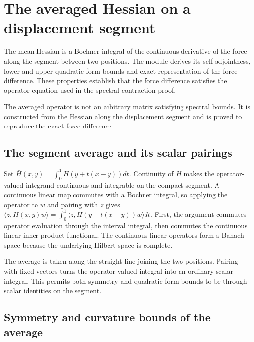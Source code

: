 \documentclass[11pt,a4paper]{report}
\begin{document}
\section{\texorpdfstring{The averaged Hessian on a displacement segment}{The averaged Hessian on a displacement segment}}
\label{proof-module-KineticLangevin-Hessian-lean}


The mean Hessian is a Bochner integral of the continuous derivative of the force along the segment between two positions. The module derives its self-adjointness, lower and upper quadratic-form bounds and exact representation of the force difference. These properties establish that the force difference satisfies the operator equation used in the spectral contraction proof.



The averaged operator is not an arbitrary matrix satisfying spectral bounds. It is constructed from the Hessian along the displacement segment and is proved to reproduce the exact force difference.

\subsection{\texorpdfstring{The segment average and its scalar pairings}{The segment average and its scalar pairings}}
\label{report-step-KineticLangevin-Hessian-lean-1}


Set \(\bar H(x,y)=\int_0^1H(y+t(x-y))dt\). Continuity of \(H\) makes the operator-valued integrand continuous and integrable on the compact segment. A continuous linear map commutes with a Bochner integral, so applying the operator to \(w\) and pairing with \(z\) gives \(\langle z,\bar H(x,y)w\rangle=\int_0^1\langle z,H(y+t(x-y))w\rangle dt\). First, the argument commutes operator evaluation through the interval integral, then commutes the continuous linear inner-product functional. The continuous linear operators form a Banach space because the underlying Hilbert space is complete.



The average is taken along the straight line joining the two positions. Pairing with fixed vectors turns the operator-valued integral into an ordinary scalar integral. This permits both symmetry and quadratic-form bounds to be through scalar identities on the segment.

\subsection{\texorpdfstring{Symmetry and curvature bounds of the average}{Symmetry and curvature bounds of the average}}
\label{report-step-KineticLangevin-Hessian-lean-2}
\end{document}

